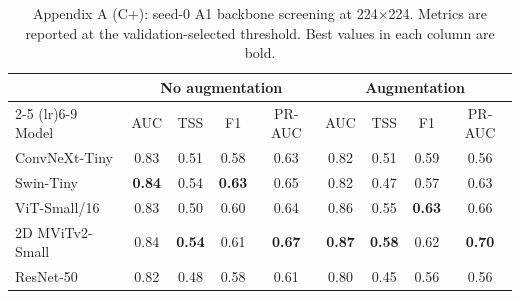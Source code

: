 \begin{table}[p]
\centering
\scriptsize
\setlength{\tabcolsep}{4pt}
\caption{Appendix A (C+): seed-0 A1 backbone screening at 224$\times$224. Metrics are reported at the validation-selected threshold. Best values in each column are bold.}
\label{tab:appA_cplus_seed0_grouped}
\begin{tabular}{lcccccccc}
\toprule
& \multicolumn{4}{c}{No augmentation} & \multicolumn{4}{c}{Augmentation} \\
\cmidrule(lr){2-5} \cmidrule(lr){6-9}
Model & AUC & TSS & F1 & PR-AUC & AUC & TSS & F1 & PR-AUC \\
\midrule
ConvNeXt-Tiny & 0.83 & 0.51 & 0.58 & 0.63 & 0.82 & 0.51 & 0.59 & 0.56 \\
Swin-Tiny & \textbf{0.84} & 0.54 & \textbf{0.63} & 0.65 & 0.82 & 0.47 & 0.57 & 0.63 \\
ViT-Small/16 & 0.83 & 0.50 & 0.60 & 0.64 & 0.86 & 0.55 & \textbf{0.63} & 0.66 \\
2D MViTv2-Small & 0.84 & \textbf{0.54} & 0.61 & \textbf{0.67} & \textbf{0.87} & \textbf{0.58} & 0.62 & \textbf{0.70} \\
ResNet-50 & 0.82 & 0.48 & 0.58 & 0.61 & 0.80 & 0.45 & 0.56 & 0.56 \\
\bottomrule
\end{tabular}
\end{table}
